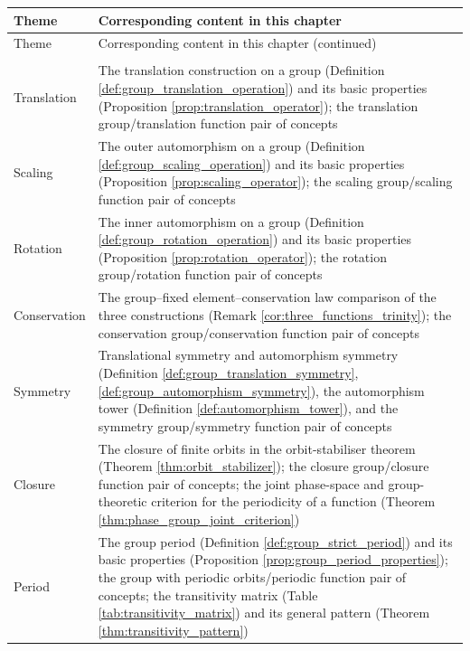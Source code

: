 \begingroup
\renewcommand{\arraystretch}{1.1}
\begin{longtable}{>{\centering\arraybackslash}p{2.8cm}>{\raggedright\arraybackslash}p{9.9cm}}
\toprule
Theme & Corresponding content in this chapter \\
\midrule
\endfirsthead
\toprule
Theme & Corresponding content in this chapter (continued) \\
\midrule
\endhead
\midrule
\multicolumn{2}{r}{Continued on next page}\\
\endfoot
\bottomrule
\endlastfoot
Translation & The translation construction on a group (Definition \ref{def:group_translation_operation}) and its basic properties (Proposition \ref{prop:translation_operator}); the translation group/translation function pair of concepts \\
Scaling & The outer automorphism on a group (Definition \ref{def:group_scaling_operation}) and its basic properties (Proposition \ref{prop:scaling_operator}); the scaling group/scaling function pair of concepts \\
Rotation & The inner automorphism on a group (Definition \ref{def:group_rotation_operation}) and its basic properties (Proposition \ref{prop:rotation_operator}); the rotation group/rotation function pair of concepts \\
Conservation & The group--fixed element--conservation law comparison of the three constructions (Remark \ref{cor:three_functions_trinity}); the conservation group/conservation function pair of concepts \\
Symmetry & Translational symmetry and automorphism symmetry (Definition \ref{def:group_translation_symmetry}, \ref{def:group_automorphism_symmetry}), the automorphism tower (Definition \ref{def:automorphism_tower}), and the symmetry group/symmetry function pair of concepts \\
Closure & The closure of finite orbits in the orbit-stabiliser theorem (Theorem \ref{thm:orbit_stabilizer}); the closure group/closure function pair of concepts; the joint phase-space and group-theoretic criterion for the periodicity of a function (Theorem \ref{thm:phase_group_joint_criterion}) \\
Period & The group period (Definition \ref{def:group_strict_period}) and its basic properties (Proposition \ref{prop:group_period_properties}); the group with periodic orbits/periodic function pair of concepts; the transitivity matrix (Table \ref{tab:transitivity_matrix}) and its general pattern (Theorem \ref{thm:transitivity_pattern}) \\
\end{longtable}
\endgroup

